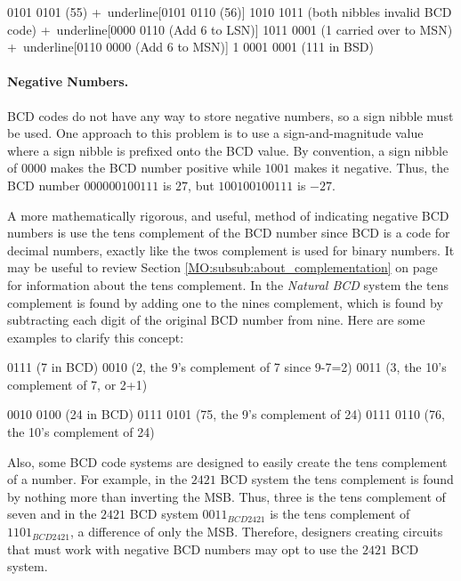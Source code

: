 \begin{binDisp}[commandchars=~\[\], samepage=true]
     0101 0101  (55)
    +~underline[0101 0110  (56)]
     1010 1011  (both nibbles invalid BCD code)
    +~underline[0000 0110  (Add 6 to LSN)]
     1011 0001  (1 carried over to MSN)
    +~underline[0110 0000  (Add 6 to MSN)]
   1 0001 0001  (111 in BSD)
\end{binDisp}

\paragraph{Negative Numbers.} \ac{BCD} codes do not have any way to store negative numbers, so a sign nibble must be used. One approach to this problem is to use a sign-and-magnitude value where a sign nibble is prefixed onto the \ac{BCD} value. By convention, a sign nibble of $ 0000 $ makes the \ac{BCD} number positive while $ 1001 $ makes it negative. Thus, the \ac{BCD} number $ 0000 0010 0111 $ is $ 27 $, but $ 1001 0010 0111 $ is $ -27 $. 

A more mathematically rigorous, and useful, method of indicating negative \ac{BCD} numbers is use the tens complement of the \ac{BCD} number since \ac{BCD} is a code for decimal numbers, exactly like the twos complement is used for binary numbers. It may be useful to review Section \ref{MO:subsub:about_complementation} on page \pageref{MO:subsub:about_complementation} for information about the tens complement. In the \emph{Natural BCD} system the tens complement is found by adding one to the nines complement, which is found by subtracting each digit of the original \ac{BCD} number from nine. Here are some examples to clarify this concept:

\begin{binDisp}[commandchars=~\[\]]
    0111 (7 in BCD)
    0010 (2, the 9's complement of 7 since 9-7=2)
    0011 (3, the 10's complement of 7, or 2+1)
\end{binDisp}

\begin{binDisp}[commandchars=~\[\]]
    0010 0100 (24 in BCD)
    0111 0101 (75, the 9's complement of 24)
    0111 0110 (76, the 10's complement of 24)
\end{binDisp}

Also, some \ac{BCD} code systems are designed to easily create the tens complement of a number. For example, in the $ 2421 $ \ac{BCD} system the tens complement is found by nothing more than inverting the \ac{MSB}. Thus, three is the tens complement of seven and in the $ 2421 $ \ac{BCD} system $ 0011_{BCD2421} $ is the tens complement of $ 1101_{BCD2421} $, a difference of only the \ac{MSB}. Therefore, designers creating circuits that must work with negative \ac{BCD} numbers may opt to use the $ 2421 $ \ac{BCD} system.

